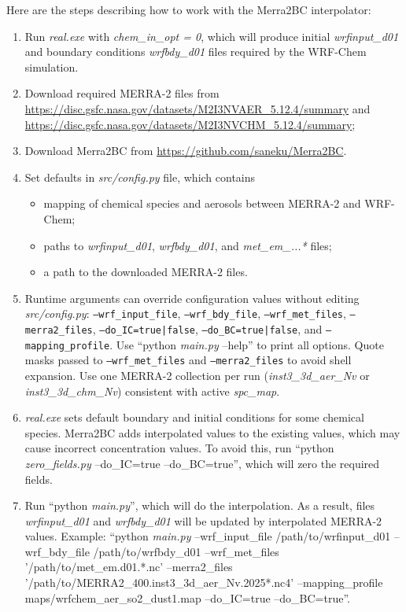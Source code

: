 \documentclass{article}
\begin{document}
Here are the steps describing how to work with the {Merra2BC} interpolator:
\begin{enumerate}
\item Run \textit{real.exe} with \textit{chem\_in\_opt = 0}, which will produce initial \textit{wrfinput\_d01} and boundary conditions \textit{wrfbdy\_d01} files required by the WRF-Chem simulation.
\item Download required MERRA-2 files from \url{https://disc.gsfc.nasa.gov/datasets/M2I3NVAER_5.12.4/summary} and \url{https://disc.gsfc.nasa.gov/datasets/M2I3NVCHM_5.12.4/summary};
\item Download {Merra2BC} from \url{https://github.com/saneku/Merra2BC}.
\item Set defaults in \textit{src/config.py} file, which contains
\begin{itemize}
\item[a.] mapping of chemical species and aerosols between MERRA-2 and WRF-Chem;
\item[b.] paths to \textit{wrfinput\_d01}, \textit{wrfbdy\_d01}, and \textit{met\_em\_...*} files;
\item[c.] a path to the downloaded MERRA-2 files.
\end{itemize}
\item Runtime arguments can override configuration values without editing \textit{src/config.py}:
\texttt{--wrf\_input\_file}, \texttt{--wrf\_bdy\_file},
\texttt{--wrf\_met\_files}, \texttt{--merra2\_files},
\texttt{--do\_IC=true|false}, \texttt{--do\_BC=true|false}, and
\texttt{--mapping\_profile}. Use ``python \textit{main.py} --help'' to print all options.
Quote masks passed to \texttt{--wrf\_met\_files} and \texttt{--merra2\_files} to avoid shell expansion.
Use one MERRA-2 collection per run (\textit{inst3\_3d\_aer\_Nv} or \textit{inst3\_3d\_chm\_Nv}) consistent with active \textit{spc\_map}.
\item \textit{real.exe} sets default boundary and initial conditions for some chemical species.  {Merra2BC} adds interpolated values to the existing values, which may cause incorrect concentration values. To avoid this, run ``python \textit{zero\_fields.py} --do\_IC=true --do\_BC=true'', which will zero the required fields.
\item Run ``python \textit{main.py}'', which will do the interpolation. As a result, files \textit{wrfinput\_d01} and \textit{wrfbdy\_d01} will be updated by interpolated MERRA-2 values. Example:
``python \textit{main.py} --wrf\_input\_file /path/to/wrfinput\_d01 --wrf\_bdy\_file /path/to/wrfbdy\_d01 --wrf\_met\_files '/path/to/met\_em.d01.*.nc' --merra2\_files '/path/to/MERRA2\_400.inst3\_3d\_aer\_Nv.2025*.nc4' --mapping\_profile maps/wrfchem\_aer\_so2\_dust1.map --do\_IC=true --do\_BC=true''.

\end{enumerate}
\end{document}
